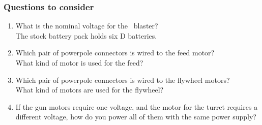 \documentclass[aspectratio=169]{beamer}
\begin{document}
\begin{frame}
\frametitle{Questions to consider}
\begin{enumerate}
\item What is the nominal voltage for the \usnaCourseNumber\ blaster?\\
{\scriptsize The stock battery pack holds six D batteries.}
\item Which pair of powerpole connectors is wired to the feed motor?\\
{\scriptsize What kind of motor is used for the feed?}
\item Which pair of powerpole connectors is wired to the flywheel motors?\\
{\scriptsize What kind of motors are used for the flywheel?}
\item If the gun motors require one voltage, and the motor for the turret requires a different voltage, how do you power all of them with the same power supply? 
\end{enumerate}
\end{frame}
\end{document}
